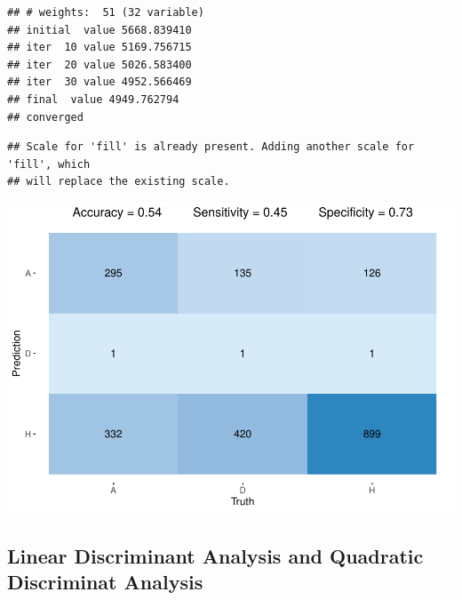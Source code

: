 \documentclass[
]{article}
\newenvironment{Shaded}{\begin{snugshade}}{\end{snugshade}}
\newcommand{\CommentTok}[1]{\textcolor[rgb]{0.56,0.35,0.01}{\textit{#1}}}
\newcommand{\KeywordTok}[1]{\textcolor[rgb]{0.13,0.29,0.53}{\textbf{#1}}}
\newcommand{\NormalTok}[1]{#1}
\newcommand{\OperatorTok}[1]{\textcolor[rgb]{0.81,0.36,0.00}{\textbf{#1}}}
\newcommand{\StringTok}[1]{\textcolor[rgb]{0.31,0.60,0.02}{#1}}
\begin{document}
\begin{verbatim}
## # weights:  51 (32 variable)
## initial  value 5668.839410 
## iter  10 value 5169.756715
## iter  20 value 5026.583400
## iter  30 value 4952.566469
## final  value 4949.762794 
## converged
\end{verbatim}

\begin{Shaded}
\end{Shaded}

\begin{verbatim}
## Scale for 'fill' is already present. Adding another scale for 'fill', which
## will replace the existing scale.
\end{verbatim}

\begin{center}\includegraphics{EPL_Model_files/figure-latex/unnamed-chunk-10-1} \end{center}

\hypertarget{linear-discriminant-analysis-and-quadratic-discriminat-analysis}{%
\subsection{Linear Discriminant Analysis and Quadratic Discriminat
Analysis}\label{linear-discriminant-analysis-and-quadratic-discriminat-analysis}}
\end{document}
